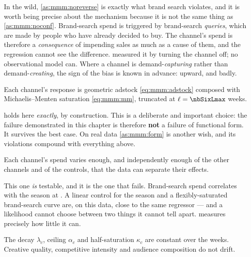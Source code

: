 In the wild, \cref{as:mmm:noreverse} is exactly what brand search violates, and it is worth being
precise about the mechanism because it is not the same thing as \cref{as:mmm:noconf}. Brand-search
spend is triggered by brand-search \emph{queries}, which are made by people who have already
decided to buy. The channel's spend is therefore a \emph{consequence} of impending sales as much
as a cause of them, and the regression cannot see the difference.  measured it by
turning the channel off; no observational model can. Where a channel is demand-\emph{capturing}
rather than demand-\emph{creating}, the sign of the bias is known in advance: upward, and badly.

\begin{assumption}\label{as:mmm:form}
Each channel's response is geometric adstock \cref{eq:mmm:adstock} composed with Michaelis--Menten
saturation \cref{eq:mmm:mm}, truncated at $\ell = \nbSixLmax$ weeks.
\end{assumption}

 holds here \emph{exactly}, by construction. This is a deliberate and important
choice: the failure demonstrated in this chapter is therefore \textbf{not} a failure of functional
form. It survives the best case. On real data \cref{as:mmm:form} is another wish, and its
violations compound with everything above.

\begin{assumption}\label{as:mmm:overlap}
Each channel's spend varies enough, and independently enough of the other channels and of the
controls, that the data can separate their effects.
\end{assumption}

This one \emph{is} testable, and it is the one that fails. Brand-search spend correlates with the
season at \nbSixCorrBsSeason{}. A linear control for the season and a flexibly-saturated
brand-search curve are, on this data, close to the same regressor --- and a likelihood cannot
choose between two things it cannot tell apart.  measures precisely how little
it can.

\begin{assumption}\label{as:mmm:stable}
The decay $\lambda_c$, ceiling $\alpha_c$ and half-saturation $\kappa_c$ are constant over the
\nbSixNWeeks{} weeks. Creative quality, competitive intensity and audience composition do not
drift.
\end{assumption}

